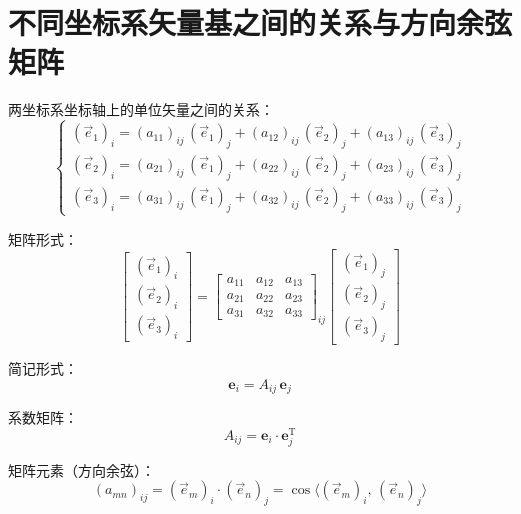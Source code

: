 \section{不同坐标系矢量基之间的关系与方向余弦矩阵}


两坐标系坐标轴上的单位矢量之间的关系：
\begin{equation}
\begin{cases}
(\vec{e}_1)_i = (a_{11})_{ij}\, (\vec{e}_1)_j + (a_{12})_{ij}\, (\vec{e}_2)_j + (a_{13})_{ij}\, (\vec{e}_3)_j \\
(\vec{e}_2)_i = (a_{21})_{ij}\, (\vec{e}_1)_j + (a_{22})_{ij}\, (\vec{e}_2)_j + (a_{23})_{ij}\, (\vec{e}_3)_j \\
(\vec{e}_3)_i = (a_{31})_{ij}\, (\vec{e}_1)_j + (a_{32})_{ij}\, (\vec{e}_2)_j + (a_{33})_{ij}\, (\vec{e}_3)_j
\end{cases}
\end{equation}

矩阵形式：
\begin{equation}
\begin{bmatrix} (\vec{e}_1)_i \\ (\vec{e}_2)_i \\ (\vec{e}_3)_i \end{bmatrix} = \begin{bmatrix} a_{11} & a_{12} & a_{13} \\ a_{21} & a_{22} & a_{23} \\ a_{31} & a_{32} & a_{33} \end{bmatrix}_{\!ij} \begin{bmatrix} (\vec{e}_1)_j \\ (\vec{e}_2)_j \\ (\vec{e}_3)_j \end{bmatrix}
\end{equation}

简记形式：
\begin{equation}\label{eq:5.basis_transform}
\boldsymbol{e}_i = A_{ij}\, \boldsymbol{e}_j
\end{equation}

系数矩阵：
\begin{equation}\label{eq:5.dcm_def}
A_{ij} = \boldsymbol{e}_i \cdot \boldsymbol{e}_j^{\mathrm{T}}
\end{equation}

矩阵元素（方向余弦）：
\begin{equation}
(a_{mn})_{ij} = (\vec{e}_m)_i \cdot (\vec{e}_n)_j = \cos\langle (\vec{e}_m)_i,\, (\vec{e}_n)_j \rangle
\end{equation}

